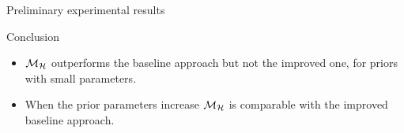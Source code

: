 \documentclass[final,hyperref={pdfpagelabels=false}]{beamer}
\begin{document}
\begin{frame}[t]
\begin{columns}[t]
\begin{column}{.485\textwidth}
\begin{block}{Preliminary experimental results}
\begin{figure}[H]
\end{figure}


\end{block}




\begin{block}{Conclusion}

\begin{itemize}
  \item  $\mathcal{M}_{\mathcal{H}}$ outperforms the baseline approach but not the improved one, for priors with small parameters.
  \item When the prior parameters increase $\mathcal{M}_{\mathcal{H}}$ is comparable with the improved baseline approach.
    


\end{itemize}
\end{block}








\end{column}
\end{columns}
\end{frame}
\end{document}

